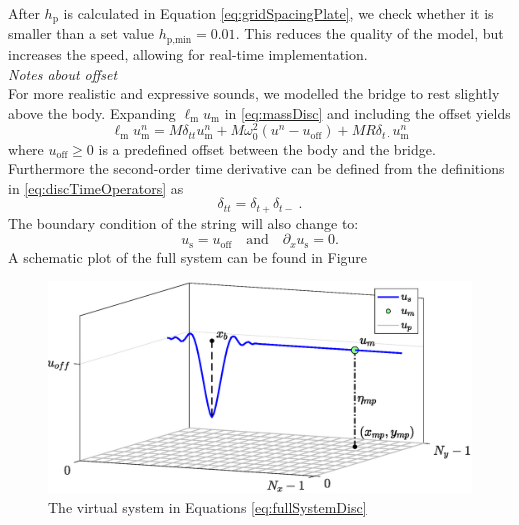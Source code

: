 \documentclass[dvipsnames, pdftex]{article}
\begin{document}
After $h_\text{p}$ is calculated in Equation \eqref{eq:gridSpacingPlate}, we check whether it is smaller than a set value $h_{\text{p},\text{min}} = 0.01$. This reduces the quality of the model, but increases the speed, allowing for real-time implementation.
\\
\textit{Notes about offset}
\\
For more realistic and expressive sounds, we modelled the bridge to rest slightly above the body. Expanding $\ell_\text{m}u_\text{m}$ in \eqref{eq:massDisc} and including the offset yields
\begin{equation}
    \ell_\text{m}u_\text{m}^n = M\delta_{tt}u_\text{m}^n+M\omega_0^2(u^n-u_\text{off})+MR\delta_{t\cdot}u_\text{m}^n
\end{equation}
where $u_\text{off} \geq 0$ is a predefined offset between the body and the bridge. Furthermore the second-order time derivative can be defined from the definitions in \eqref{eq:discTimeOperators} as
\begin{equation}
    \delta_{tt} = \delta_{t+}\delta_{t-}\ .
\end{equation}
The boundary condition of the string will also change to:
\begin{equation}
    u_\text{s} = u_\text{off}\quad \text{and} \quad \partial_xu_\text{s}=0.
\end{equation}
A schematic plot of the full system can be found in Figure 

  
\begin{figure}
  \centering
  \includegraphics[width=1.0\columnwidth]{trombaSystem.eps}
  \caption{The virtual system in Equations \eqref{eq:fullSystemDisc}}
  \label{fig:trombaSystem}
\end{figure}
\end{document}
